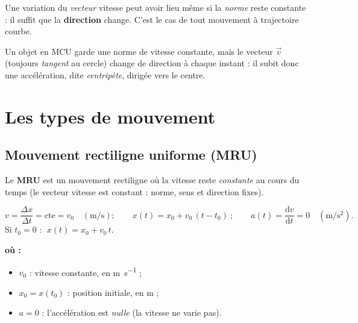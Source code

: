 \documentclass[11pt,a4paper]{article}
\newenvironment{ou}{%
  \par\smallskip\noindent\textbf{où :}\nopagebreak
  \begin{itemize}[leftmargin=1.8em,topsep=2pt,itemsep=1.5pt,parsep=0pt]}%
  {\end{itemize}}
\newcommand{\vv}[1]{\vec{#1}}
\newcommand{\dd}{\mathrm{d}}
\newcommand{\ms}{\si{\metre\per\second}}
\newcommand{\mss}{\si{\metre\per\second\squared}}
\begin{document}
\begin{attention}
Une variation du \emph{vecteur} vitesse peut avoir lieu même si la \emph{norme} reste constante :
il suffit que la \textbf{direction} change. C'est le cas de tout mouvement à trajectoire courbe.
\end{attention}

\begin{exemple}
Un objet en MCU garde une norme de vitesse constante, mais le vecteur $\vv{v}$ (toujours
\emph{tangent} au cercle) change de direction à chaque instant : il subit donc une accélération,
dite \emph{centripète}, dirigée vers le centre.
\end{exemple}

\begin{center}
\end{center}

\section{Les types de mouvement}

\subsection{Mouvement rectiligne uniforme (MRU)}

\begin{definition}[MRU]
Le \textbf{MRU} est un mouvement rectiligne où la vitesse reste \emph{constante} au cours du temps
(le vecteur vitesse est constant : norme, sens et direction fixes).
\end{definition}

\begin{formule}
\[ v=\dfrac{\Delta x}{\Delta t}=\text{cte}=v_0\quad(\ms);\qquad
   \boxed{x(t)=x_0+v_0\,(t-t_0)}\ ;\qquad a(t)=\dfrac{\dd v}{\dd t}=0\quad(\mss). \]
Si $t_0=0$ : $\;x(t)=x_0+v_0\,t$.
\begin{ou}
  \item $v_0$ : vitesse constante, en \si{\metre\per\second} ;
  \item $x_0=x(t_0)$ : position initiale, en \si{\metre} ;
  \item $a=0$ : l'accélération est \emph{nulle} (la vitesse ne varie pas).
\end{ou}
\end{formule}
\end{document}
